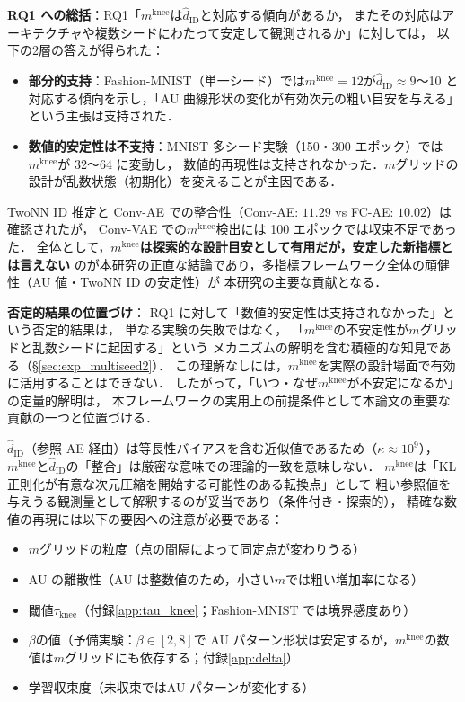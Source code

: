 \documentclass[11pt,a4paper]{jsarticle}
\newcommand{\kap}{\kappa}
\newcommand{\mknee}{m^{\mathrm{knee}}}
\begin{document}
\textbf{RQ1 への総括}：RQ1「$\mknee$は$\hat{d}_\mathrm{ID}$と対応する傾向があるか，
またその対応はアーキテクチャや複数シードにわたって安定して観測されるか」に対しては，
以下の2層の答えが得られた：

\begin{itemize}
  \item \textbf{部分的支持}：Fashion-MNIST（単一シード）では$\mknee = 12$が$\hat{d}_\mathrm{ID} \approx 9$〜10
        と対応する傾向を示し，「AU 曲線形状の変化が有効次元の粗い目安を与える」という主張は支持された．
  \item \textbf{数値的安定性は不支持}：MNIST 多シード実験（150・300 エポック）では$\mknee$が 32〜64 に変動し，
        数値的再現性は支持されなかった．$m$グリッドの設計が乱数状態（初期化）を変えることが主因である．
\end{itemize}

TwoNN ID 推定と Conv-AE での整合性（Conv-AE: $11.29$ vs FC-AE: $10.02$）は確認されたが，
Conv-VAE での$\mknee$検出には 100 エポックでは収束不足であった．
全体として，\textbf{$\mknee$は探索的な設計目安として有用だが，安定した新指標とは言えない}
のが本研究の正直な結論であり，多指標フレームワーク全体の頑健性（AU 値・TwoNN ID の安定性）が
本研究の主要な貢献となる．

\textbf{否定的結果の位置づけ}：
RQ1 に対して「数値的安定性は支持されなかった」という否定的結果は，
単なる実験の失敗ではなく，
「$\mknee$の不安定性が$m$グリッドと乱数シードに起因する」という
メカニズムの解明を含む積極的な知見である（§\ref{sec:exp_multiseed2}）．
この理解なしには，$\mknee$を実際の設計場面で有効に活用することはできない．
したがって，「いつ・なぜ$\mknee$が不安定になるか」の定量的解明は，
本フレームワークの実用上の前提条件として本論文の重要な貢献の一つと位置づける．

$\hat{d}_\mathrm{ID}$（参照 AE 経由）は等長性バイアスを含む近似値であるため（$\kap \approx 10^9$），
$\mknee$と$\hat{d}_\mathrm{ID}$の「整合」は厳密な意味での理論的一致を意味しない．
$\mknee$は「KL 正則化が有意な次元圧縮を開始する可能性のある転換点」として
粗い参照値を与えうる観測量として解釈するのが妥当であり（条件付き・探索的），
精確な数値の再現には以下の要因への注意が必要である：
\begin{itemize}
  \item $m$グリッドの粒度（点の間隔によって同定点が変わりうる）
  \item AU の離散性（AU は整数値のため，小さい$m$では粗い増加率になる）
  \item 閾値$\tau_{\mathrm{knee}}$（付録\ref{app:tau_knee}；Fashion-MNIST では境界感度あり）
  \item $\beta$の値（予備実験：$\beta \in [2, 8]$で AU パターン形状は安定するが，$\mknee$の数値は$m$グリッドにも依存する；付録\ref{app:delta}）
  \item 学習収束度（未収束ではAU パターンが変化する）
\end{itemize}
\end{document}
